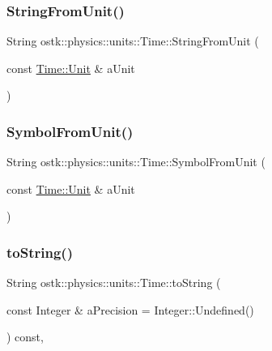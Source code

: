 \subsubsection{\texorpdfstring{String\+From\+Unit()}{StringFromUnit()}}
{\footnotesize\ttfamily String ostk\+::physics\+::units\+::\+Time\+::\+String\+From\+Unit (\begin{DoxyParamCaption}\item[{const \hyperlink{classostk_1_1physics_1_1units_1_1_time_aa961f0dbca7ec297e19e15e0dfa3bb4a}{Time\+::\+Unit} \&}]{a\+Unit }\end{DoxyParamCaption})\hspace{0.3cm}{\ttfamily [static]}}

\mbox{\label{classostk_1_1physics_1_1units_1_1_time_ae9740ed97b634fb099d1ba46e064cb0c}} 
\subsubsection{\texorpdfstring{Symbol\+From\+Unit()}{SymbolFromUnit()}}
{\footnotesize\ttfamily String ostk\+::physics\+::units\+::\+Time\+::\+Symbol\+From\+Unit (\begin{DoxyParamCaption}\item[{const \hyperlink{classostk_1_1physics_1_1units_1_1_time_aa961f0dbca7ec297e19e15e0dfa3bb4a}{Time\+::\+Unit} \&}]{a\+Unit }\end{DoxyParamCaption})\hspace{0.3cm}{\ttfamily [static]}}

\mbox{\label{classostk_1_1physics_1_1units_1_1_time_a6805d7d9b298d1ba9f219294e11a363c}} 
\subsubsection{\texorpdfstring{to\+String()}{toString()}}
{\footnotesize\ttfamily String ostk\+::physics\+::units\+::\+Time\+::to\+String (\begin{DoxyParamCaption}\item[{const Integer \&}]{a\+Precision = {\ttfamily Integer\+:\+:Undefined()} }\end{DoxyParamCaption}) const\hspace{0.3cm}{\ttfamily [override]}, {\ttfamily [virtual]}}



